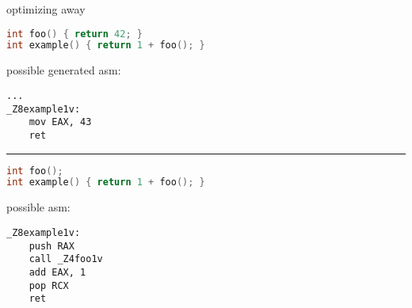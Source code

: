 \begin{frame}[fragile,label=optAway]{optimizing away}
\begin{lstlisting}[language=C++,style=smaller]
int foo() { return 42; }
int example() { return 1 + foo(); }
\end{lstlisting}
possible generated asm:
\begin{lstlisting}[language=myasm,style=smaller]
...
_Z8example1v:
    mov EAX, 43
    ret
\end{lstlisting}
\hrule
\begin{lstlisting}[language=C++,style=smaller]
int foo();
int example() { return 1 + foo(); }
\end{lstlisting}
possible asm:
\begin{lstlisting}[language=myasm,style=smaller]
_Z8example1v:
    push RAX
    call _Z4foo1v
    add EAX, 1
    pop RCX
    ret
\end{lstlisting}
\end{frame}
